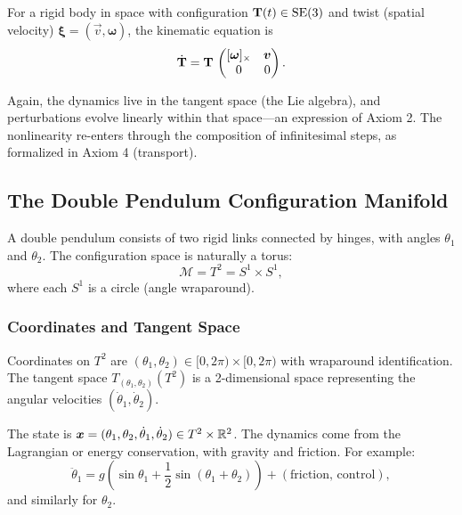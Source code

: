 For a rigid body in space with configuration $\mathbf{T}(t) \in \mathrm{SE}(3)$ and twist (spatial
velocity) $\boldsymbol{\xi} = (\vec{v}, \boldsymbol{\omega})$, the kinematic equation is
\begin{equation}
\dot{\mathbf{T}} = \mathbf{T} \, \begin{pmatrix} [\boldsymbol{\omega}]_{\times} & \bm{v} \\ 0 & 0 \end{pmatrix}.
\label{eq:ch1:SE3-kinematics}
\end{equation}

Again, the dynamics live in the tangent space (the Lie algebra), and perturbations evolve
linearly within that space---an expression of Axiom 2. The nonlinearity re-enters through
the composition of infinitesimal steps, as formalized in Axiom 4 (transport).

\subsection{The Double Pendulum Configuration Manifold}

A double pendulum consists of two rigid links connected by hinges, with angles $\theta_1$
and $\theta_2$. The configuration space is naturally a torus:
\begin{equation}
\mathcal{M} = T^2 = S^1 \times S^1,
\label{eq:ch1:double-pend-manifold}
\end{equation}
where each $S^1$ is a circle (angle wraparound).

\subsubsection{Coordinates and Tangent Space}

Coordinates on $T^2$ are $(\theta_1, \theta_2) \in [0, 2\pi) \times [0, 2\pi)$ with wraparound
identification. The tangent space $T_{(\theta_1, \theta_2)}(T^2)$ is a 2-dimensional space
representing the angular velocities $(\dot\theta_1, \dot\theta_2)$.

The state is $\bm{x} = (\theta_1, \theta_2, \dot\theta_1, \dot\theta_2) \in T^2 \times \mathbb{R}^2$.
The dynamics come from the Lagrangian or energy conservation, with gravity and friction.
For example:
\begin{equation}
\ddot\theta_1 = g(\sin\theta_1 + \frac{1}{2}\sin(\theta_1 + \theta_2)) + (\text{friction, control}) ,
\label{eq:ch1:double-pend-dyn}
\end{equation}
and similarly for $\theta_2$.

